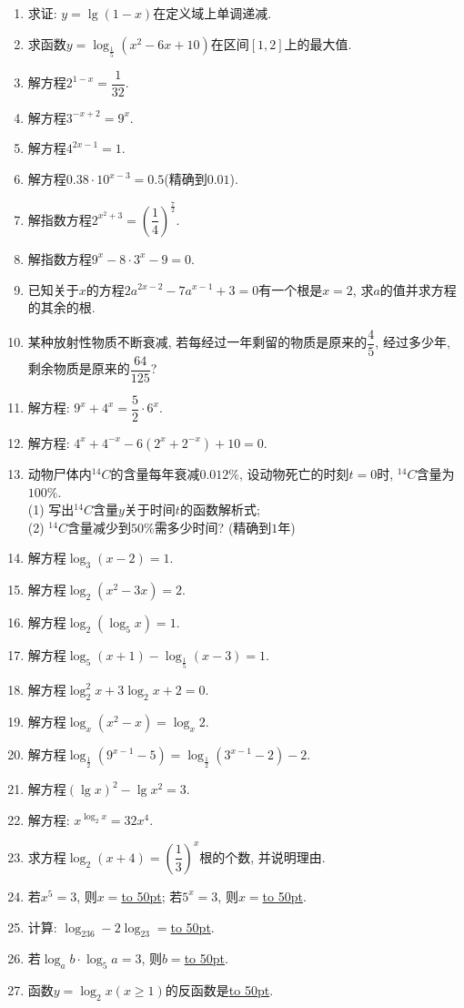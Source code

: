 \documentclass[10pt,a4paper]{article}
\newcommand{\blank}[1]{\underline{\hbox to #1pt{}}}
\begin{document}
\begin{enumerate}[1.]
\item 求证: $y=\lg(1-x)$在定义域上单调递减.
\item 求函数$y=\log _{\frac 15}(x^2-6x+10)$在区间$[1,2]$上的最大值.
\item 解方程$2^{1-x}=\dfrac 1{32}$.
\item 解方程$3^{-x+2}=9^x$.
\item 解方程$4^{2x-1}=1$.
\item 解方程$0.38\cdot 10^{x-3}=0.5$(精确到$0.01$).
\item 解指数方程$2^{x^2+3}=(\dfrac 14)^{\frac 72}$.
\item 解指数方程$9^x-8\cdot 3^x-9=0$.
\item 已知关于$x$的方程$2a^{2x-2}-7a^{x-1}+3=0$有一个根是$x=2$, 求$a$的值并求方程的其余的根.
\item 某种放射性物质不断衰减, 若每经过一年剩留的物质是原来的$\dfrac 45$, 经过多少年, 剩余物质是原来的$\dfrac{64}{125}$?
\item 解方程: $9^x+4^x=\dfrac 52\cdot 6^x$.
\item 解方程: $4^x+4^{-x}-6(2^x+2^{-x})+10=0$.
\item 动物尸体内$^{14}C$的含量每年衰减$0.012\%$, 设动物死亡的时刻$t=0$时, $^{14}C$含量为$100\%$.\\
(1) 写出$^{14}C$含量$y$关于时间$t$的函数解析式;\\
(2) $^{14}C$含量减少到$50\%$需多少时间? (精确到$1$年)
\item 解方程$\log _3(x-2)=1$.
\item 解方程$\log _2(x^2-3x)=2$.
\item 解方程$\log _2(\log _5x)=1$.
\item 解方程$\log _5(x+1)-\log _{\frac 15}(x-3)=1$.
\item 解方程$\log _2^2x+3\log _2x+2=0$.
\item 解方程$\log _x(x^2-x)=\log _x2$.
\item 解方程$\log _{\frac 12}(9^{x-1}-5)=\log _{\frac 12}(3^{x-1}-2)-2$.
\item 解方程$(\lg x)^2-\lg x^2=3$.
\item 解方程: $x^{\log _2x}=32x^4$.
\item 求方程$\log _2(x+4)=(\dfrac 13)^x$根的个数, 并说明理由.
\item 若$x^5=3$, 则$x=$\blank{50}; 若$5^x=3$, 则$x=$\blank{50}.
\item 计算: $\log _236-2\log _23=$\blank{50}.
\item 若$\log _ab\cdot \log _5a=3$, 则$b=$\blank{50}.
\item 函数$y=\log _2x(x\ge 1)$的反函数是\blank{50}.

\end{enumerate}
\end{document}
